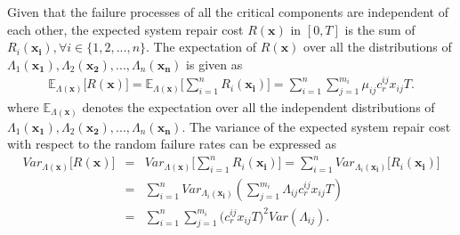 \documentclass[preprint,12pt]{elsarticle}
\begin{document}
Given that the failure processes of all the critical components are independent of each other, the expected system repair cost $R(\boldsymbol{x})$ in $[0,T]$ is the sum of $R_{i}(\boldsymbol{x_i}), \forall i \in \{1,2,...,n\}$. The expectation of $R(\boldsymbol{x})$ over all the distributions of $\Lambda_{1}(\boldsymbol{x_{1}}),\Lambda_{2}(\boldsymbol{x_{2}}),..., \Lambda_{n}(\boldsymbol{x_{n}})$ is given as
\begin {eqnarray}
\mathbb{E}_{\Lambda(\boldsymbol{x})} \bigg[ R(\boldsymbol{x}) \bigg]= \mathbb{E}_{\Lambda(\boldsymbol{x})} \bigg[ \sum_{i=1}^{n}R_{i}(\boldsymbol{x_{i}}) \bigg]=\sum_{i=1}^{n}\sum_{j=1}^{m_{i}}{\mu_{ij}c_r^{ij}x_{ij}}T. \label{ER}
\end {eqnarray}
where $\mathbb{E}_{\Lambda(\boldsymbol{x})}$ denotes the expectation over all the independent distributions of $\Lambda_{1}(\boldsymbol{x_{1}}),\Lambda_{2}(\boldsymbol{x_{2}}),..., \Lambda_{n}(\boldsymbol{x_{n}})$.
The variance of the expected system repair cost with respect to the random failure rates can be expressed as
\begin {eqnarray}
 Var_{\Lambda(\boldsymbol{x})} \bigg[ R(\boldsymbol{x}) \bigg]  &=&Var_{\Lambda(\boldsymbol{x})} \bigg[ \sum_{i=1}^{n}R_{i}(\boldsymbol{x_{i}}) \bigg]
= \sum_{i=1}^{n} Var_{\Lambda_i(\boldsymbol{x_{i}})}\bigg[R_{i}(\boldsymbol{x_i})\bigg] \nonumber \\
 &=& \sum_{i=1}^{n} Var_{\Lambda_i(\boldsymbol{x_{i}})}(\sum_{j=1}^{m_{i}}{\Lambda_{ij}c_r^{ij}x_{ij}}T) \nonumber\\
&=& \sum_{i=1}^{n} \sum_{j=1}^{m_{i}}{(c_r^{ij}x_{ij}}T)^2 Var(\Lambda_{ij}).
\end {eqnarray}
\end{document}

